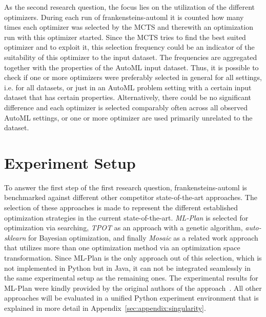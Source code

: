 As the second research question, the focus lies on the utilization of the different optimizers.
During each run of frankensteins-automl it is counted how many times each optimizer was selected by the MCTS and therewith an optimization run with this optimizer started.
Since the MCTS tries to find the best suited optimizer and to exploit it, this selection frequency could be an indicator of the suitability of this optimizer to the input dataset.\newline
The frequencies are aggregated together with the properties of the AutoML input dataset.
Thus, it is possible to check if one or more optimizers were preferably selected in general for all settings, i.e. for all datasets, or just in an AutoML problem setting with a certain input dataset that has certain properties.
Alternatively, there could be no significant difference and each optimizer is selected comparably often across all observed AutoML settings, or one or more optimizer are used primarily unrelated to the dataset.

\section{Experiment Setup}
\label{sec:evaluation:setup}
To answer the first step of the first research question, frankensteins-automl is benchmarked against different other competitor state-of-the-art approaches.
The selection of these approaches is made to represent the different established optimization strategies in the current state-of-the-art.\newline
\textit{ML-Plan} is selected for optimization via searching, \textit{TPOT} as an approach with a genetic algorithm, \textit{auto-sklearn} for Bayesian optimization, and finally \textit{Mosaic} as a related work approach that utilizes more than one optimization method via an optimization space transformation.\newline
Since ML-Plan is the only approach out of this selection, which is not implemented in Python but in Java, it can not be integrated seamlessly in the same experimental setup as the remaining ones.
The experimental results for ML-Plan were kindly provided by the original authors of the approach~\textcite{Mohr-ML-Plan}.
All other approaches will be evaluated in a unified Python experiment environment that is explained in more detail in Appendix~\ref{sec:appendix:singularity}.

